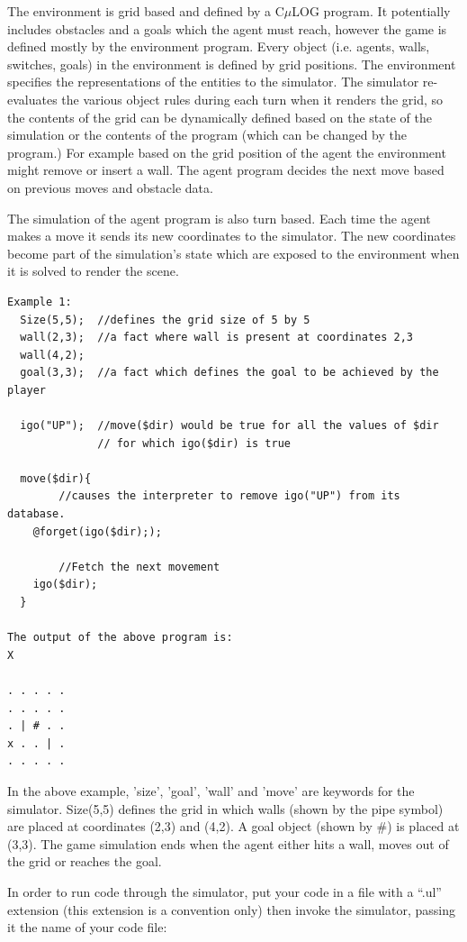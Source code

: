 \documentclass[onecolumn,titlepage]{article}
\begin{document}
The environment is grid based and defined by a C$\mu$LOG program. It
potentially includes obstacles and a goals which the agent must reach,
however the game is defined mostly by the environment
program. Every object (i.e. agents, walls, switches, goals) in the
environment is defined by grid positions. The environment specifies
the representations of the entities to the simulator. The simulator
re-evaluates the various object rules during each turn when it renders the
grid, so the contents of the grid can be dynamically defined based on
the state of the simulation or the contents of the program (which can
be changed by the program.) For example based on the grid position of
the agent the environment might remove or insert a wall. The agent
program decides the next move based on previous moves and obstacle
data.

The simulation of the agent program is also turn based. Each time the
agent makes a move it sends its new coordinates to the simulator. The
new coordinates become part of the simulation's state which are
exposed to the environment when it is solved to render the scene.

\begin{verbatim}
Example 1:
  Size(5,5);  //defines the grid size of 5 by 5
  wall(2,3);  //a fact where wall is present at coordinates 2,3 	
  wall(4,2);
  goal(3,3);  //a fact which defines the goal to be achieved by the player	

  igo("UP");  //move($dir) would be true for all the values of $dir
              // for which igo($dir) is true

  move($dir){
        //causes the interpreter to remove igo("UP") from its database.
    @forget(igo($dir);); 

        //Fetch the next movement 
    igo($dir);
  }

The output of the above program is:
X

. . . . .
. . . . .
. | # . .
x . . | .
. . . . .
\end{verbatim}


In the above example, 'size', 'goal', 'wall' and 'move' are keywords
for the simulator.  Size(5,5) defines the grid in which walls (shown by
the pipe symbol) are placed at coordinates (2,3) and (4,2). A goal
object (shown by \#) is placed at (3,3).  The game simulation ends when
the agent either hits a wall, moves out of the grid or reaches the
goal. 

In order to run code through the simulator, put your code in a file
with a ``.ul'' extension (this extension is a convention only) then
invoke the simulator, passing it the name of your code file:
\end{document}
